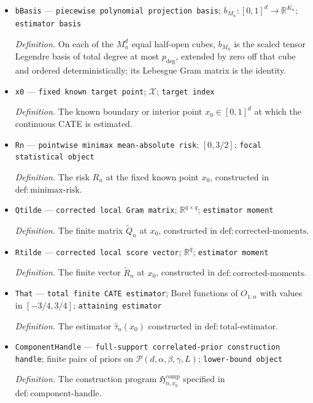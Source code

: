 \documentclass{article}
\begin{document}
\begin{itemize}
  \item \texttt{bBasis} --- \texttt{piecewise polynomial projection basis}; \(b_{M_n}:[0,1]^d\to\mathbb R^{K_n}\); \texttt{estimator basis}
  \par\smallskip\noindent\emph{Definition.} On each of the \(M_n^d\) equal half-open cubes, \(b_{M_n}\) is the scaled tensor Legendre basis of total degree at most \(p_{\mathrm{deg}}\), extended by zero off that cube and ordered deterministically; its Lebesgue Gram matrix is the identity.
  \item \texttt{x0} --- \texttt{fixed known target point}; \(\mathcal X\); \texttt{target index}
  \par\smallskip\noindent\emph{Definition.} The known boundary or interior point \(x_0\in[0,1]^d\) at which the continuous CATE is estimated.
  \item \texttt{Rn} --- \texttt{pointwise minimax mean-\allowbreak{}absolute risk}; \([0,3/2]\); \texttt{focal statistical object}
  \par\smallskip\noindent\emph{Definition.} The risk \(R_n\) at the fixed known point \(x_0\), constructed in \(\mathrm{def:minimax\mbox{-}risk}\).
  \item \texttt{Qtilde} --- \texttt{corrected local Gram matrix}; \(\mathbb R^{q\times q}\); \texttt{estimator moment}
  \par\smallskip\noindent\emph{Definition.} The finite matrix \(\widetilde Q_n\) at \(x_0\), constructed in \(\mathrm{def:corrected\mbox{-}moments}\).
  \item \texttt{Rtilde} --- \texttt{corrected local score vector}; \(\mathbb R^q\); \texttt{estimator moment}
  \par\smallskip\noindent\emph{Definition.} The finite vector \(\widetilde R_n\) at \(x_0\), constructed in \(\mathrm{def:corrected\mbox{-}moments}\).
  \item \texttt{That} --- \texttt{total finite CATE estimator}; Borel functions of \(O_{1:n}\) with values in \([-3/4,3/4]\); \texttt{attaining estimator}
  \par\smallskip\noindent\emph{Definition.} The estimator \(\widehat\tau_n(x_0)\) constructed in \(\mathrm{def:total\mbox{-}estimator}\).
  \item \texttt{ComponentHandle} --- \texttt{full-\allowbreak{}support correlated-\allowbreak{}prior construction handle}; finite pairs of priors on \(\mathcal P(d,\alpha,\beta,\gamma,L)\); \texttt{lower-\allowbreak{}bound object}
  \par\smallskip\noindent\emph{Definition.} The construction program \(\mathfrak H_{n,x_0}^{\mathrm{comp}}\) specified in \(\mathrm{def:component\mbox{-}handle}\).
\end{itemize}
\end{document}

